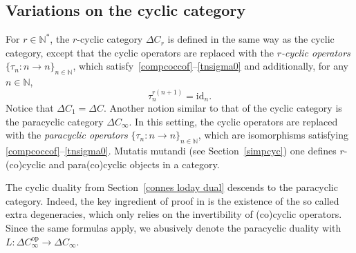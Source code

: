 \documentclass[pdftex]{sigma}
\numberwithin{equation}{section}
\newcommand{\co}{\colon}
\newcommand{\id}{\mathrm{id}}
\newcommand{\opp}{\mathrm{op}}
\newcommand{\N}{\mathbb{N}}
\begin{document}
\subsection{Variations on the cyclic category}


For $r\in \N^*$, the $r$-cyclic category $\Delta C_r$ is defined in the same way as the cyclic category, except that the cyclic operators are replaced with the $r$\emph{-cyclic operators} $\{\tau_n\co n \to n\}_{n\in \N}$, which satisfy~\eqref{compcoccof}--\eqref{tnsigma0} and additionally, for any~$n\in \N$,
\begin{equation*}%
 \tau_n^{r(n+1)}= \id_n.
\end{equation*}
Notice that $\Delta C_1=\Delta C$.
Another notion similar to that of the cyclic category is the paracyclic category $\Delta C_\infty$. In this setting, the cyclic operators are replaced with the \emph{paracyclic ope\-rators} $\{\tau_n\co n \to n\}_{n\in \N}$, which are isomorphisms satisfying \eqref{compcoccof}--\eqref{tnsigma0}.
Mutatis mutandi (see Section~\ref{simpcyc}) one defines $r$-(co)cyclic and para(co)cyclic objects in a category.

The cyclic duality from Section~\ref{connes loday dual} descends to the paracyclic category.
Indeed, the key ingredient of proof in \cite{loday98} is the existence of the so called extra dege\-neracies, which only relies on the invertibility of (co)cyclic operators. Since the same formulas apply, we abusively denote the paracyclic duality with $L \co \Delta C^\opp_\infty \to \Delta C_\infty$.
\end{document}
